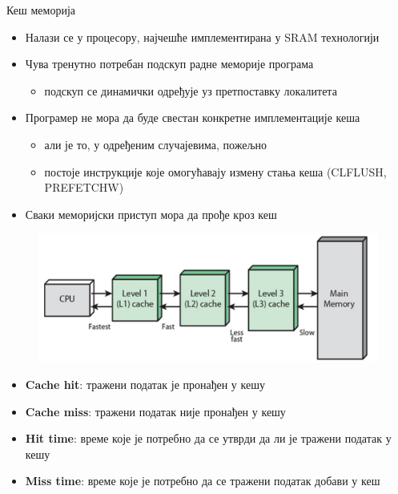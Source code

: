 \documentclass[xcolor=table]{beamer}
\begin{document}
    \begin{frame}[allowframebreaks]{Кеш меморија}
        \begin{itemize}
            \item Налази се у процесору, најчешће имплементирана у SRAM технологији
            \item Чува тренутно потребан подскуп радне меморије програма
            \begin{itemize}
                \item подскуп се динамички одређује уз претпоставку локалитета
            \end{itemize}
            \item Програмер не мора да буде свестан конкретне имплементације кеша
            \begin{itemize}
                \item али је то, у одређеним случајевима, пожељно
                \item постоје инструкције које омогућавају измену стања кеша (CLFLUSH, PREFETCHW)
            \end{itemize}
            \item Сваки меморијски приступ мора да прође кроз кеш
        \end{itemize}
        
        \framebreak

        \begin{figure}
            \centering
            \includegraphics[width=\textwidth,height=\textheight,keepaspectratio]{images/mem2.jpg}
            \label{fig:mem2}
        \end{figure}
        
        \framebreak
        
        \begin{itemize}
            \item \textbf{Cache hit}: тражени податак је пронађен у кешу
            \item \textbf{Cache miss}: тражени податак није пронађен у кешу
            \item \textbf{Hit time}: време које је потребно да се утврди да ли је тражени податак у кешу
            \item \textbf{Miss time}: време које је потребно да се тражени податак добави у кеш
        \end{itemize}
    \end{frame}
    
\end{document}
